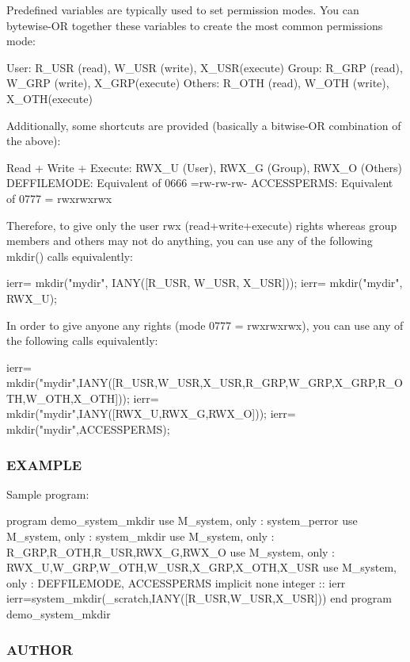 \begin{DoxyVerb}Predefined variables are typically used to set permission modes.
You can bytewise-OR together these variables to create the most common
permissions mode:

 User:    R_USR  (read),  W_USR  (write),  X_USR(execute)
 Group:   R_GRP  (read),  W_GRP  (write),  X_GRP(execute)
 Others:  R_OTH  (read),  W_OTH  (write),  X_OTH(execute)

Additionally, some shortcuts are provided (basically a bitwise-OR combination of the above):

  Read + Write + Execute: RWX_U (User), RWX_G (Group), RWX_O (Others)
  DEFFILEMODE: Equivalent of 0666 =rw-rw-rw-
  ACCESSPERMS: Equivalent of 0777 = rwxrwxrwx

Therefore, to give only the user rwx (read+write+execute) rights whereas
group members and others may not do anything, you can use any of the
following mkdir() calls equivalently:

  ierr= mkdir("mydir", IANY([R_USR, W_USR, X_USR]));
  ierr= mkdir("mydir", RWX_U);

In order to give anyone any rights (mode 0777 = rwxrwxrwx), you can
use any of the following calls equivalently:

  ierr= mkdir("mydir",IANY([R_USR,W_USR,X_USR,R_GRP,W_GRP,X_GRP,R_OTH,W_OTH,X_OTH]));
  ierr= mkdir("mydir",IANY([RWX_U,RWX_G,RWX_O]));
  ierr= mkdir("mydir",ACCESSPERMS);
\end{DoxyVerb}


\subsubsection*{E\+X\+A\+M\+P\+LE}

Sample program\+:

program demo\+\_\+system\+\_\+mkdir use M\+\_\+system, only \+: system\+\_\+perror use M\+\_\+system, only \+: system\+\_\+mkdir use M\+\_\+system, only \+: R\+\_\+\+G\+RP,R\+\_\+\+O\+TH,R\+\_\+\+U\+SR,R\+W\+X\+\_\+G,R\+W\+X\+\_\+O use M\+\_\+system, only \+: R\+W\+X\+\_\+U,W\+\_\+\+G\+RP,W\+\_\+\+O\+TH,W\+\_\+\+U\+SR,X\+\_\+\+G\+RP,X\+\_\+\+O\+TH,X\+\_\+\+U\+SR use M\+\_\+system, only \+: D\+E\+F\+F\+I\+L\+E\+M\+O\+DE, A\+C\+C\+E\+S\+S\+P\+E\+R\+MS implicit none integer \+:\+: ierr ierr=system\+\_\+mkdir(\textquotesingle{}\+\_\+scratch\textquotesingle{},I\+A\+N\+Y(\mbox{[}\+R\+\_\+\+U\+S\+R,\+W\+\_\+\+U\+S\+R,\+X\+\_\+\+U\+S\+R\mbox{]})) end program demo\+\_\+system\+\_\+mkdir

\subsubsection*{A\+U\+T\+H\+OR}


